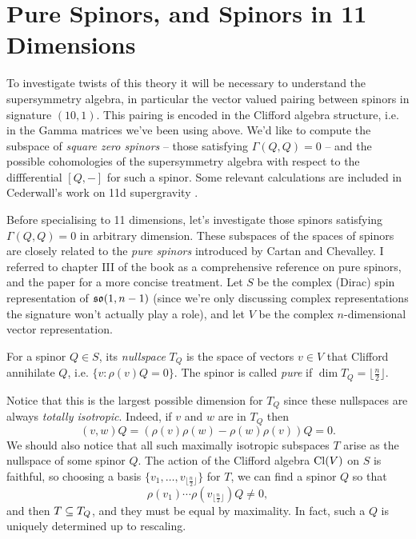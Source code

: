 \documentclass[10pt, oneside]{article}
\begin{document}
\section{Pure Spinors, and Spinors in 11 Dimensions}
To investigate twists of this theory it will be necessary to understand the supersymmetry algebra, in particular the vector valued pairing between spinors in signature $(10,1)$.  This pairing is encoded in the Clifford algebra structure, i.e. in the Gamma matrices we've been using above.  We'd like to compute the subspace of \emph{square zero spinors} -- those satisfying $\Gamma(Q,Q) = 0$ -- and the possible cohomologies of the supersymmetry algebra with respect to the diffferential $[Q,-]$ for such a spinor.  Some relevant calculations are included in Cederwall's work on 11d supergravity \cite{Cederwall1} \cite{Cederwall2}.

Before specialising to 11 dimensions, let's investigate those spinors satisfying $\Gamma(Q,Q) = 0$ in arbitrary dimension.  These subspaces of the spaces of spinors are closely related to the \emph{pure spinors} introduced by Cartan and Chevalley.  I referred to chapter III of the book \cite{Chevalley} as a comprehensive reference on pure spinors, and the paper \cite{BudinichTrautman} for a more concise treatment.   Let $S$ be the complex (Dirac) spin representation of $\mathfrak{so}(1,n-1)$ (since we're only discussing complex representations the signature won't actually play a role), and let $V$ be the complex $n$-dimensional vector representation.
\begin{definition}
For a spinor $Q \in S$, its \emph{nullspace} $T_Q$ is the space of vectors $v \in V$ that Clifford annihilate $Q$, i.e. $\{v \colon \rho(v)Q = 0\}$.  The spinor is called \emph{pure} if $\dim T_Q = \lfloor \frac n2 \rfloor$.
\end{definition}
Notice that this is the largest possible dimension for $T_Q$ since these nullspaces are always \emph{totally isotropic}.  Indeed, if $v$ and $w$ are in $T_Q$ then
\[(v,w)Q = (\rho(v)\rho(w) - \rho(w)\rho(v))Q = 0.\]
We should also notice that all such maximally isotropic subspaces $T$ arise as the nullspace of some spinor $Q$.  The action of the Clifford algebra $\mathrm{Cl}(V)$ on $S$ is faithful, so choosing a basis $\{v_1, \ldots, v_{\lfloor \frac n2 \rfloor}\}$ for $T$, we can find a spinor $Q$ so that
\[\rho(v_1) \cdots \rho(v_{\lfloor \frac n2 \rfloor}) Q \ne 0,\]
and then $T \subseteq T_Q$, and they must be equal by maximality.  In fact, such a $Q$ is uniquely determined up to rescaling.
\end{document}
